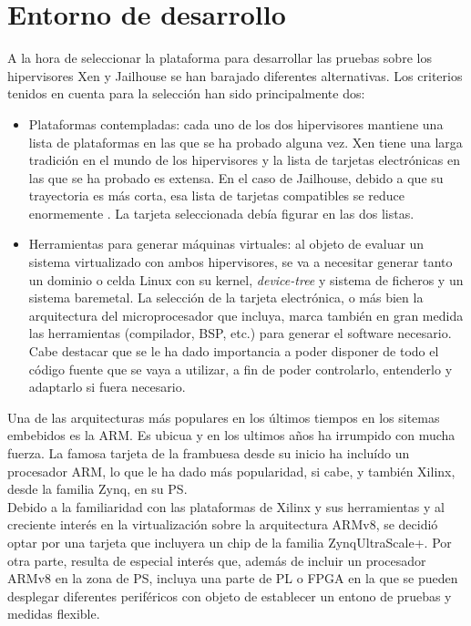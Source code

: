 \chapter{Entorno de desarrollo}

A la hora de seleccionar la plataforma para desarrollar las pruebas sobre los hipervisores Xen y Jailhouse se han barajado diferentes alternativas. Los criterios tenidos en cuenta para la selección han sido principalmente dos:
\begin{itemize}
  \item Plataformas contempladas: cada uno de los dos hipervisores mantiene una lista de plataformas en las que se ha probado alguna vez. Xen tiene una larga tradición en el mundo de los hipervisores y la lista de tarjetas electrónicas en las que se ha probado es extensa. En el caso de Jailhouse, debido a que su trayectoria es más corta, esa lista de tarjetas compatibles se reduce enormemente \cite{jailhouse_github}. La tarjeta seleccionada debía figurar en las dos listas.
  \item Herramientas para generar máquinas virtuales: al objeto de evaluar un sistema virtualizado con ambos hipervisores, se va a necesitar generar tanto un dominio o celda Linux con su kernel, \textit{device-tree} y sistema de ficheros y un sistema baremetal. La selección de la tarjeta electrónica, o más bien la arquitectura del microprocesador que incluya, marca también en gran medida las herramientas (compilador, BSP, etc.) para generar el software necesario. Cabe destacar que se le ha dado importancia a poder disponer de todo el código fuente que se vaya a utilizar, a fin de poder controlarlo, entenderlo y adaptarlo si fuera necesario.
\end{itemize}

Una de las arquitecturas más populares en los últimos tiempos en los sitemas embebidos es la ARM. Es ubicua y en los ultimos años ha irrumpido con mucha fuerza. La famosa tarjeta de la frambuesa desde su inicio ha incluído un procesador ARM, lo que le ha dado más popularidad, si cabe, y también Xilinx, desde la familia Zynq, en su PS.\\
Debido a la familiaridad con las plataformas de Xilinx y sus herramientas y al creciente interés en la virtualización sobre la arquitectura ARMv8, se decidió optar por una tarjeta que incluyera un chip de la familia Zynq\textregistered UltraScale+\texttrademark. Por otra parte, resulta de especial interés que, además de incluir un procesador ARMv8 en la zona de PS, incluya una parte de PL o FPGA en la que se pueden desplegar diferentes periféricos con objeto de establecer un entono de pruebas y medidas flexible.


